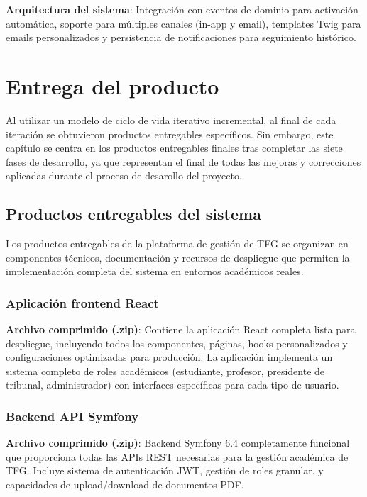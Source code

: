 \documentclass[12pt,a4paper,oneside]{report}
\begin{document}
\textbf{Arquitectura del sistema}: Integración con eventos de dominio para activación automática, soporte para múltiples canales (in-app y email), templates Twig para emails personalizados y persistencia de notificaciones para seguimiento histórico.

\chapter{Entrega del producto}\label{entrega-del-producto}

Al utilizar un modelo de ciclo de vida iterativo incremental, al final de cada iteración se obtuvieron productos entregables específicos. Sin embargo, este capítulo se centra en los productos entregables finales tras completar las siete fases de desarrollo, ya que representan el final de todas las mejoras y correcciones aplicadas durante el proceso de desarollo del proyecto.

\section{Productos entregables del sistema}\label{productos-entregables-del-sistema}

Los productos entregables de la plataforma de gestión de TFG se organizan en componentes técnicos, documentación y recursos de despliegue que permiten la implementación completa del sistema en entornos académicos reales.

\subsection{Aplicación frontend React}\label{aplicacion-frontend-react}

\textbf{Archivo comprimido (.zip)}: Contiene la aplicación React completa lista para despliegue, incluyendo todos los componentes, páginas, hooks personalizados y configuraciones optimizadas para producción. La aplicación implementa un sistema completo de roles académicos (estudiante, profesor, presidente de tribunal, administrador) con interfaces específicas para cada tipo de usuario.

\subsection{Backend API Symfony}\label{backend-api-symfony}

\textbf{Archivo comprimido (.zip)}: Backend Symfony 6.4 completamente funcional que proporciona todas las APIs REST necesarias para la gestión académica de TFG. Incluye sistema de autenticación JWT, gestión de roles granular, y capacidades de upload/download de documentos PDF.
\end{document}
